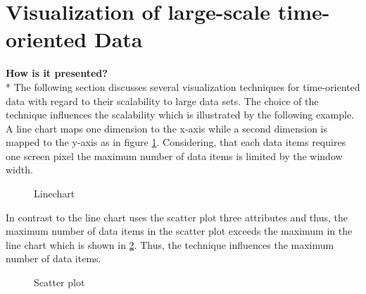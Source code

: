 \section{Visualization of large-scale time-oriented Data} \label{vis}
\textbf{How is it presented?}\\*
The following section discusses several visualization techniques for time-oriented data with regard to their scalability to large data sets. The choice of the technique influences the scalability which is illustrated by the following example. 
A line chart maps one dimension to the x-axis while a second dimension is mapped to the y-axis as in figure \ref{fig:linechart}. Considering, that each data items requires one screen pixel the maximum number of data items is limited by the window width. 
\begin{figure}[H]
    \centering
    \caption{Linechart}
    \label{fig:linechart}
\end{figure}
 
In contrast to the line chart uses the scatter plot three attributes and thus, the maximum number of data items in the scatter plot exceeds the maximum in the line chart which is shown in \ref{fig:scatterplot}. Thus, the technique influences the maximum number of data items. 
\begin{figure}[H]
    \centering
    \caption{Scatter plot}
    \label{fig:scatterplot}
\end{figure}
 

